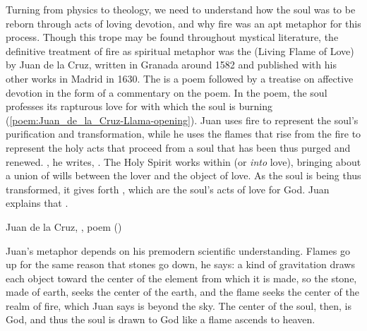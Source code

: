 Turning from physics to theology, we need to understand how the soul was to
be reborn through acts of loving devotion, and why fire was an apt metaphor
for this process.
Though this trope may be found throughout mystical literature, the definitive
treatment of fire as spiritual metaphor was the 
(Living Flame of Love) by Juan de la Cruz, written in Granada around 1582 and
published with his other works in Madrid in 1630.
The  is a poem followed by a treatise on affective
devotion in the form of a commentary on the poem.
In the poem, the soul professes its rapturous love for  with which the soul is burning
(\cref{poem:Juan_de_la_Cruz-Llama-opening}).
Juan uses fire to represent the soul's purification and transformation, while
he uses the flames that rise from the fire to represent the holy acts that
proceed from a soul that has been thus purged and renewed.
, he writes, .%
    \Autocite[790]{JuandelaCruz:Llama} 
The Holy Spirit works within  (or
\emph{into} love), bringing about a union of wills between the lover and the
object of love.
As the soul is being thus transformed, it gives forth , which
are the soul's acts of love for God.
Juan explains that .%
    \Autocite[790]{JuandelaCruz:Llama}

{Juan de la Cruz, , poem ()}

Juan's metaphor depends on his premodern scientific understanding. 
Flames go up for the same reason that stones go down, he says: a kind of
gravitation draws each object toward the center of the element from which it is
made, so the stone, made of earth, seeks the center of the earth, and the flame
seeks the center of the realm of fire, which Juan says is beyond the sky.%
    \Autocite[792--795]{JuandelaCruz:Llama}
The center of the soul, then, is God, and thus the soul is drawn to God like a
flame ascends to heaven.

